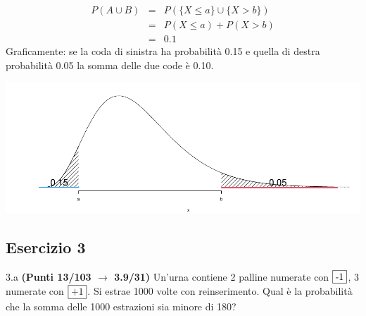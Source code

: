 \documentclass[
  11pt,
]{book}
\theoremstyle{mytheoremstyle}
\theoremstyle{mydefstyle}
\newenvironment{sol}
  {
  \begin{tcolorbox}[enhanced,breakable,arc=0.1mm,boxrule=1pt,colback=white,colframe=iblue,
  title=\bf \fontfamily{lmss}\selectfont \hspace{.5 cm} Soluzione,drop fuzzy shadow]

}{
\end{tcolorbox}
  }
\begin{document}
\begin{sol}

\begin{eqnarray*}
P( A\cup  B) &=& P(\{X\le a\}\cup\{X > b\})\\
             &=& P(X\le a)+P(X > b)\\
             &=& 0.1
\end{eqnarray*}
Graficamente: se la coda di sinistra ha probabilità 0.15 e quella di destra probabilità 0.05 la somma delle due code è 0.10.

\begin{center}\includegraphics{Esami_passati_con_soluzioni_files/figure-latex/unnamed-chunk-99-1} \end{center}

\end{sol}

\subsection{Esercizio 3}\label{esercizio-3-49}

3.a \textbf{(Punti 13/103 \(\rightarrow\) 3.9/31)} Un'urna contiene 2 palline numerate con \(\fbox{-1}\), 3 numerate con \(\fbox{+1}\). Si estrae 1000 volte con reinserimento. Qual è la probabilità che la somma delle 1000 estrazioni sia minore di 180?
\end{document}
